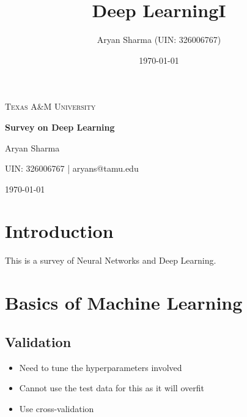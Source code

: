 \documentclass[letterpaper]{article}
\title{Deep LearningI}
\author{Aryan Sharma (UIN: 326006767)}
\date{\today}
\newcommand\blankpage{%
	\null
	\thispagestyle{empty}%
	\addtocounter{page}{-1}%
	\newpage}
\begin{document}


\begin{titlepage}
	\centering
	{\scshape\LARGE Texas A\&M University \par}
	\vspace{1cm}
	{\scshape\Large \par}
	\vspace{1.5cm}
	{\huge\bfseries Survey on Deep Learning\par}
	\vspace{2cm}
	{\Large Aryan Sharma \par}
	{\normalsize UIN: 326006767 | aryans@tamu.edu\par}
	\vfill
	
	{\large \today\par}
\end{titlepage}

\tableofcontents

\newpage

\section{Introduction}

This is a survey of Neural Networks and Deep Learning.

\section{Basics of Machine Learning}

\subsection{Validation}

\begin{itemize}
	\item Need to tune the hyperparameters involved
	\item Cannot use the test data for this as it will overfit
	\item Use cross-validation
\end{itemize}
\end{document}

